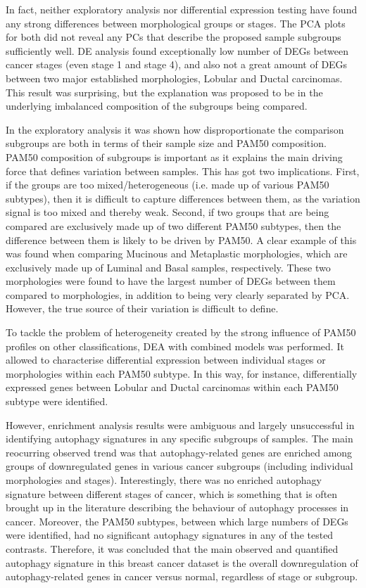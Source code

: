In fact, neither exploratory analysis nor differential expression testing have found any strong differences between morphological groups or stages. The PCA plots for both did not reveal any PCs that describe the proposed sample subgroups sufficiently well. DE analysis found exceptionally low number of DEGs between cancer stages (even stage 1 and stage 4), and also not a great amount of DEGs between two major established morphologies, Lobular and Ductal carcinomas. This result was surprising, but the explanation was proposed to be in the underlying imbalanced composition of the subgroups being compared.

In the exploratory analysis it was shown how disproportionate the comparison subgroups are both in terms of their sample size and PAM50 composition. PAM50 composition of subgroups is important as it explains the main driving force that defines variation between samples. This has got two implications. First, if the groups are too mixed/heterogeneous (i.e. made up of various PAM50 subtypes), then it is difficult to capture differences between them, as the variation signal is too mixed and thereby weak. Second, if two groups that are being compared are exclusively made up of two different PAM50 subtypes, then the difference between them is likely to be driven by PAM50. A clear example of this was found when comparing Mucinous and Metaplastic morphologies, which are exclusively made up of Luminal and Basal samples, respectively. These two morphologies were found to have the largest number of DEGs between them compared to morphologies, in addition to being very clearly separated by PCA. However,  the true source of their variation is difficult to define. 

To tackle the problem of heterogeneity created by the strong influence of PAM50 profiles on other classifications, DEA with combined models was performed. It allowed to characterise differential expression between individual stages or morphologies within each PAM50 subtype. In this way, for instance, differentially expressed genes between Lobular and Ductal carcinomas within each PAM50 subtype were identified. 

However, enrichment analysis results were ambiguous and largely unsuccessful in identifying autophagy signatures in any specific subgroups of samples. The main reocurring observed trend was that autophagy-related genes are enriched among groups of downregulated genes in various cancer subgroups (including individual morphologies and stages). Interestingly, there was no enriched autophagy signature between different stages of cancer, which is something that is often brought up in the literature describing the behaviour of autophagy processes in cancer. Moreover, the PAM50 subtypes, between  which  large numbers of DEGs were identified, had no significant autophagy signatures in any of the tested contrasts. Therefore, it was concluded that the main observed and quantified autophagy signature in this breast cancer dataset is the overall downregulation of autophagy-related genes in cancer versus normal, regardless of stage or subgroup.

